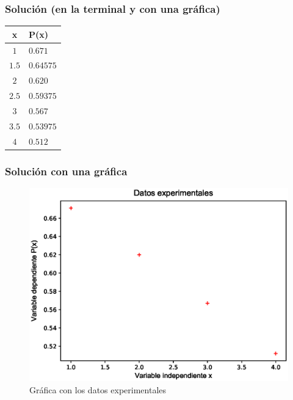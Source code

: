 \begin{frame}[fragile]
\frametitle{Solución (en la terminal y con una gráfica)}
\begin{center}
\begin{tabular}{c | l}
x & P(x) \\
\hline $1$   & $0.671$ \\
\hline $1.5$ & $0.64575$ \\
\hline $2$   & $0.620$ \\
\hline $2.5$ & $0.59375$ \\
\hline $3$   & $0.567$ \\
\hline $3.5$ & $0.53975$ \\
\hline $4$   & $0.512$
\end{tabular}
\end{center}
\end{frame}
\begin{frame}
\frametitle{Solución con una gráfica}
\begin{figure}
	\centering
	\includegraphics[scale=0.5]{Imagenes/InterpLagrangen3_01.eps}
	\caption{Gráfica con los datos experimentales}
\end{figure}
\end{frame}

